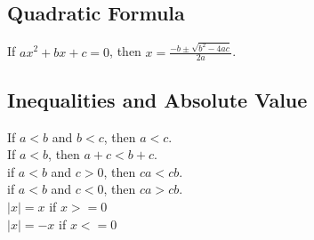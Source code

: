 \documentclass{article}
\begin{document}
	\subsection*{Quadratic Formula}
		\begin{center}
		If $ax^2 + bx +c = 0$, then $x = \frac{-b \pm \sqrt{b^2 - 4ac}}{2a}$.
		\end{center}
	\subsection*{Inequalities and Absolute Value}
		\begin{center}
		If $a < b$ and $b < c$, then $a < c$.\\
		\vspace{10pt}
		If $a < b$, then $a + c < b + c$.\\
		\vspace{10pt}
		if $a < b$ and $c > 0$, then $ca < cb$.\\
		\vspace{10pt}
		if $a < b$ and $c < 0$, then $ca > cb$.\\
		\vspace{10pt}
		$\left|x\right| = x$ if $x >= 0$\\
		\vspace{10pt}
		$\left|x\right| = -x$ if $x <= 0$
		\end{center}
		
\end{document}
